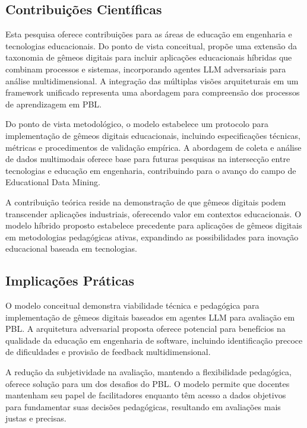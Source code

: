 \documentclass[english, spanish, brazilian]{modelo_dt}
\begin{document}
\subsection{Contribuições Científicas}

Esta pesquisa oferece contribuições para as áreas de educação em engenharia e
tecnologias educacionais\@. Do ponto de vista conceitual, propõe uma extensão
da taxonomia de gêmeos digitais para incluir aplicações educacionais híbridas
que combinam processos e sistemas, incorporando agentes LLM adversariais para
análise multidimensional\@. A integração das múltiplas visões arquiteturais em um
framework unificado representa uma abordagem para compreensão dos processos de
aprendizagem em PBL\@.

Do ponto de vista metodológico, o modelo estabelece um protocolo para
implementação de gêmeos digitais educacionais, incluindo especificações
técnicas, métricas e procedimentos de validação empírica\@. A abordagem de
coleta e análise de dados multimodais oferece base para futuras pesquisas na
intersecção entre tecnologias e educação em engenharia, contribuindo para o
avanço do campo de Educational Data Mining\@.

A contribuição teórica reside na demonstração de que gêmeos digitais podem
transcender aplicações industriais, oferecendo valor em contextos
educacionais\@. O modelo híbrido proposto estabelece precedente para aplicações
de gêmeos digitais em metodologias pedagógicas ativas, expandindo as
possibilidades para inovação educacional baseada em tecnologias\@.

\subsection{Implicações Práticas}

O modelo conceitual demonstra viabilidade técnica e pedagógica para
implementação de gêmeos digitais baseados em agentes LLM para avaliação em
PBL\@. A arquitetura adversarial proposta oferece potencial para benefícios na
qualidade da educação em engenharia de software, incluindo identificação
precoce de dificuldades e provisão de feedback multidimensional\@.

A redução da subjetividade na avaliação, mantendo a flexibilidade pedagógica,
oferece solução para um dos desafios do PBL\@. O modelo permite que docentes
mantenham seu papel de facilitadores enquanto têm acesso a dados objetivos para
fundamentar suas decisões pedagógicas, resultando em avaliações mais justas e
precisas\@.
\end{document}
